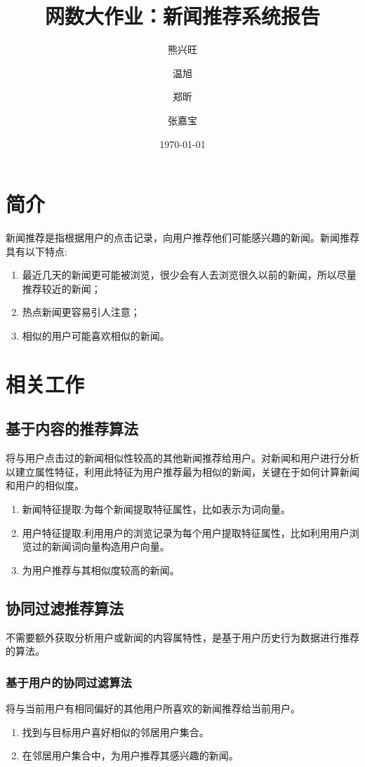 \documentclass[UTF8]{article}
\begin{document}
\title{网数大作业：新闻推荐系统报告}
\author[*]{熊兴旺}
\author[*]{温旭}
\author[*]{郑昕}
\author[*]{张嘉宝}

\date{\normalsize\today}
\clearpage
\maketitle

\tableofcontents

\newpage
\section{简介}
	新闻推荐是指根据用户的点击记录，向用户推荐他们可能感兴趣的新闻。新闻推荐具有以下特点:
    \begin{enumerate}
        \item 最近几天的新闻更可能被浏览，很少会有人去浏览很久以前的新闻，所以尽量推荐较近的新闻；
        \item 热点新闻更容易引人注意；
        \item 相似的用户可能喜欢相似的新闻。
    \end{enumerate}
\section{相关工作}
\subsection{基于内容的推荐算法}
	将与用户点击过的新闻相似性较高的其他新闻推荐给用户。对新闻和用户进行分析以建立属性特征，利用此特征为用户推荐最为相似的新闻，关键在于如何计算新闻和用户的相似度。
	\begin{enumerate}
		\item 新闻特征提取:为每个新闻提取特征属性，比如表示为词向量。
        \item 用户特征提取:利用用户的浏览记录为每个用户提取特征属性，比如利用用户浏览过的新闻词向量构造用户向量。
        \item 为用户推荐与其相似度较高的新闻。
	\end{enumerate}

\subsection{协同过滤推荐算法}
不需要额外获取分析用户或新闻的内容属特性，是基于用户历史行为数据进行推荐的算法。
\subsubsection{基于用户的协同过滤算法}
将与当前用户有相同偏好的其他用户所喜欢的新闻推荐给当前用户。
	\begin{enumerate}
        \item 找到与目标用户喜好相似的邻居用户集合。
        \item 在邻居用户集合中，为用户推荐其感兴趣的新闻。
    \end{enumerate}
\end{document}
